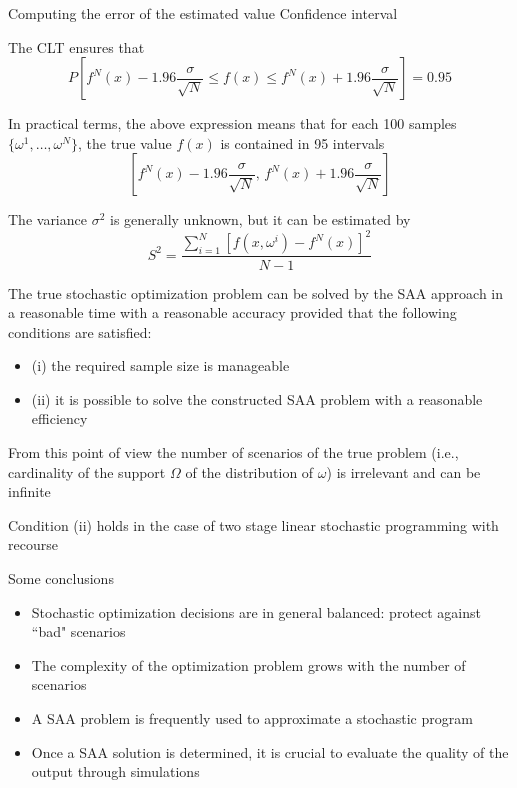 \begin{frame}{Computing the error of the estimated value}
{Confidence interval}

The CLT ensures that
\[
P\left[f^N(x) - 1.96\frac{\sigma}{\sqrt{N}} \leq f(x) \leq f^N(x) + 1.96\frac{\sigma}{\sqrt{N}}\right]= 0.95
\]
\pula

In practical terms, the above expression  means that for each 100 samples $\{\omega^1,\ldots,\omega^N\}$, the true value $f(x)$ is contained in 95 intervals
\[
\left[f^N(x) - 1.96\frac{\sigma}{\sqrt{N}} ,\, f^N(x) + 1.96\frac{\sigma}{\sqrt{N}}\right]
\]
\pula

The variance  $\sigma^2$ is generally unknown, but it can be estimated by
\[
S^2 = \frac{\sum_{i=1}^N [f(x,\omega^i) - f^N(x)]^2}{N-1}
\]
 \end{frame} 


\begin{frame}{ }
The true stochastic optimization problem can be solved by
the SAA approach in a reasonable time with a reasonable accuracy provided
that the following conditions are satisfied:
\begin{itemize}
\item  (i) the required sample size is
manageable
\item  (ii) it is possible to solve the constructed SAA problem with
a reasonable efficiency
\end{itemize} 
\pula 

From this point of view the number of scenarios of
the true problem (i.e., cardinality of the support $\Omega$ of the distribution of $\omega$)
is irrelevant and can be infinite
\pula

Condition (ii) holds in the case of two
stage linear stochastic programming with recourse

\end{frame}
  
  
\begin{frame} {Some conclusions} 
\begin{itemize}

\item Stochastic optimization decisions are in general balanced: protect against ``bad" scenarios
\pula


\item The complexity of the optimization problem grows with the number of
scenarios
\pula

\item A SAA problem is frequently used to approximate a stochastic program
\pula

\item Once a SAA solution is determined, it is crucial to evaluate the quality of the output through simulations
\end{itemize}

\end{frame}
